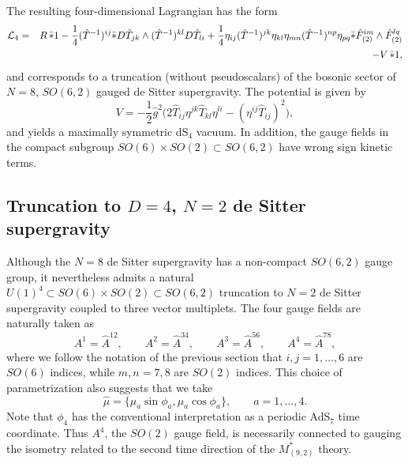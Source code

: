 \documentclass[a4paper,12pt]{article}
\begin{document}
The resulting four-dimensional Lagrangian has the form
%
\begin{eqnarray}
{\cal L}_4&=&R\,\bar{\ast}1-\frac{1}{4}(\hat T^{-1})^{ij}\bar{\ast}D\hat
T_{jk}\wedge (\hat T^{-1})^{kl}D\hat T_{li}
+\frac{1}{4}\eta_{ij}(\hat T^{-1})^{jk}\eta_{kl}
\eta_{mn}(\hat T^{-1})^{np}\eta_{pq}
\bar{\ast}\hat F^{im}_{(2)}\wedge\hat F^{lq}_{(2)}\nonumber\\
&&\qquad-V\,\bar{\ast}1,
\label{eq:d4n8lag}
\end{eqnarray}
%
and corresponds to a truncation (without pseudoscalars) of the bosonic
sector of $N=8$, $SO(6,2)$ gauged de Sitter supergravity.  The potential
is given by
%
\begin{equation}
V=-\frac{1}{2}\hat g^2\Bigr(2\hat T_{ij}\eta^{jk}\hat T_{kl}\eta^{li}
-(\eta^{ij}\hat T_{ij})^2\Bigr),
\end{equation}
%
and yields a maximally symmetric dS$_4$ vacuum.  In addition, the gauge
fields in the compact subgroup $SO(6)\times SO(2) \subset SO(6,2)$ have
wrong sign kinetic terms.

\subsection{Truncation to $D=4$, $N=2$ de Sitter supergravity}

Although the $N=8$ de Sitter supergravity has a non-compact $SO(6,2)$
gauge group, it nevertheless admits a natural $U(1)^4 \subset SO(6)\times SO(2)
\subset SO(6,2)$ truncation to $N=2$ de Sitter supergravity coupled to
three vector multiplets.  The four gauge fields are naturally taken as
%
\begin{equation}
A^1=\hat A^{12},\qquad
A^2=\hat A^{34},\qquad
A^3=\hat A^{56},\qquad
A^4=\hat A^{78},
\end{equation}
%
where we follow the notation of the previous section that
$i,j=1,\ldots,6$ are $SO(6)$ indices, while $m,n=7,8$ are $SO(2)$
indices.  This choice of parametrization also suggests that we take
%
\begin{equation}
\hat \mu=\{\mu_a\sin\phi_a,\mu_a\cos\phi_a\},\qquad a=1,\ldots,4.
\end{equation}
%
Note that $\phi_4$ has the conventional interpretation as a periodic
AdS$_7$ time coordinate.  Thus $A^4$, the $SO(2)$ gauge field, is
necessarily connected to gauging the isometry related to the second time
direction of the $M^*_{(9,2)}$ theory.
\end{document}
